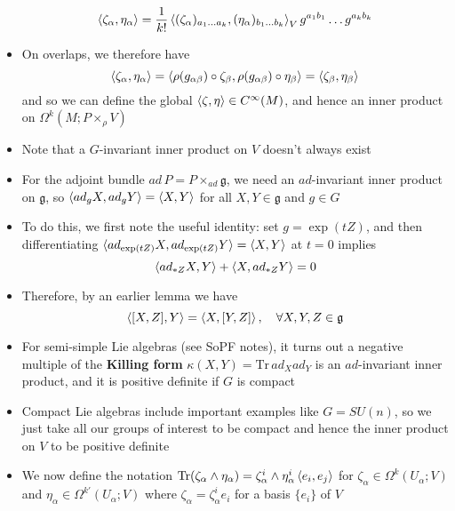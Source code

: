 \documentclass[12pt,a4paper]{article}
\numberwithin{equation}{section}
\begin{document}
\begin{itemize}
		\begin{equation}
			\braket{\zeta_{\alpha},\eta_{\alpha}}=\frac{1}{k!}\braket{(\zeta_{\alpha})_{a_{1}\ldots a_{k}},(\eta_{\alpha})_{b_{1}\ldots b_{k}}}_{V}g^{a_{1}b_{1}}\ldots g^{a_{k}b_{k}}
		\end{equation}
		\item On overlaps, we therefore have
		\begin{equation}
			\braket{\zeta_{\alpha},\eta_{\alpha}}=\braket{\rho(g_{\alpha\beta})\circ\zeta_{\beta},\rho(g_{\alpha\beta})\circ\eta_{\beta}}=\braket{\zeta_{\beta},\eta_{\beta}}
		\end{equation}
		and so we can define the global $\braket{\zeta,\eta}\in C^{\infty}(M)$, and hence an inner product on $\Omega^{k}(M;P\times_{\rho}V)$
		\item Note that a $G$-invariant inner product on $V$ doesn't always exist
		\item For the adjoint bundle $ad\,P=P\times_{ad}\mathfrak{g}$, we need an $ad$-invariant inner product on $\mathfrak{g}$, so $\braket{ad_{g}X,ad_{g}Y}=\braket{X,Y}$ for all $X,Y\in\mathfrak{g}$ and $g\in G$
		\item To do this, we first note the useful identity: set $g=\exp(tZ)$, and then differentiating $\braket{ad_{\exp(tZ)}X,ad_{\exp(tZ)}Y}=\braket{X,Y}$ at $t=0$ implies
		\begin{equation}
			\braket{ad_{*Z}X,Y}+\braket{X,ad_{*Z}Y}=0
		\end{equation}
		\item Therefore, by an earlier lemma we have
		\begin{equation}
			\braket{[X,Z],Y}=\braket{X,[Y,Z]},\quad\forall X,Y,Z\in\mathfrak{g}
		\end{equation}
		\item For semi-simple Lie algebras (see SoPF notes), it turns out a negative multiple of the \textbf{Killing form} $\kappa(X,Y)=\text{Tr}\,ad_{X}ad_{Y}$ is an $ad$-invariant inner product, and it is positive definite if $G$ is compact
		\item Compact Lie algebras include important examples like $G=SU(n)$, so we just take all our groups of interest to be compact and hence the inner product on $V$ to be positive definite
		\item We now define the notation $\text{Tr}(\zeta_{\alpha}\wedge \eta_{\alpha})=\zeta_{\alpha}^{i}\wedge\eta_{\alpha}^{i}\braket{e_{i},e_{j}}$ for $\zeta_{\alpha}\in\Omega^{k}(U_{\alpha};V)$ and $\eta_{\alpha}\in\Omega^{k'}(U_{\alpha};V)$ where $\zeta_{\alpha}=\zeta_{\alpha}^{i}e_{i}$ for a basis $\{e_{i}\}$ of $V$

\end{itemize}
\end{document}
